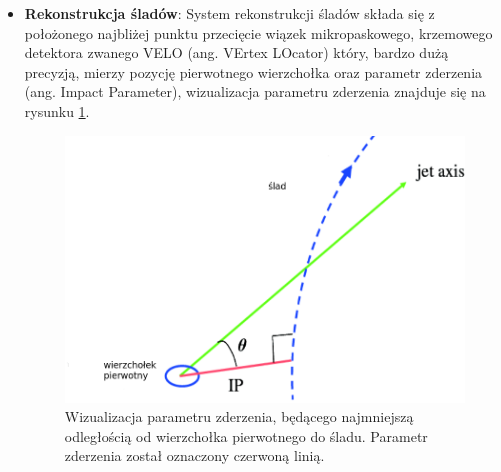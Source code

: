 \begin{itemize}
\item \textbf{Rekonstrukcja śladów}: System rekonstrukcji śladów składa się z położonego najbliżej punktu przecięcie wiązek mikropaskowego, krzemowego detektora zwanego VELO (ang. VErtex LOcator) który, bardzo dużą precyzją,   mierzy pozycję pierwotnego wierzchołka oraz parametr zderzenia (ang. Impact Parameter), wizualizacja parametru zderzenia znajduje się na rysunku \ref{fig:IP}.
\begin{figure}[th] 
  \centering
  \includegraphics[scale=0.5]{rozdzial2/impactParameter.png}
  \caption{Wizualizacja parametru zderzenia, będącego najmniejszą odległością od wierzchołka pierwotnego do śladu. Parametr zderzenia został oznaczony czerwoną linią. }
  \label{fig:IP}
\end{figure}


\end{itemize}
